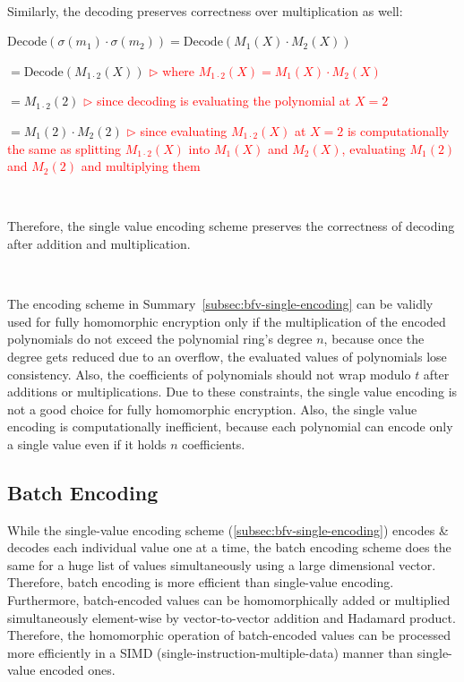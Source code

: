$ $

Similarly, the decoding preserves correctness over multiplication as well:

$\text{Decode}(\sigma(m_1) \cdot \sigma(m_2)) = \text{Decode}(M_1(X) \cdot M_2(X))$

$= \text{Decode}(M_{1\cdot2}(X))$ \textcolor{red}{$\rhd$ where $M_{1\cdot2}(X) = M_1(X) \cdot M_2(X)$}

$= M_{1\cdot2}(2)$ \textcolor{red}{$\rhd$ since decoding is evaluating the polynomial at $X = 2$}

$= M_{1}(2) \cdot M_{2}(2)$ \textcolor{red}{$\rhd$ since evaluating $M_{1\cdot2}(X)$ at $X=2$ is computationally the same as splitting $M_{1\cdot2}(X)$ into $M_{1}(X)$ and $M_{2}(X)$, evaluating $M_1(2)$ and $M_2(2)$ and multiplying them}




$ $

Therefore, the single value encoding scheme preserves the correctness of decoding after addition and multiplication. 

$ $

The encoding scheme in Summary~\ref*{subsec:bfv-single-encoding} can be validly used for fully homomorphic encryption only if the multiplication of the encoded polynomials do not exceed the polynomial ring's degree $n$, because once the degree gets reduced due to an overflow, the evaluated values of polynomials lose consistency. Also, the coefficients of polynomials should not wrap modulo $t$ after additions or multiplications. 
Due to these constraints, the single value encoding is not a good choice for fully homomorphic encryption. Also, the single value encoding is computationally inefficient, because each polynomial can encode only a single value even if it holds $n$ coefficients. 


\subsection{Batch Encoding}
\label{subsec:bfv-batch-encoding}

While the single-value encoding scheme (\autoref{subsec:bfv-single-encoding}) encodes \& decodes each individual value one at a time, the batch encoding scheme does the same for a huge list of values simultaneously using a large dimensional vector. Therefore, batch encoding is more efficient than single-value encoding. Furthermore, batch-encoded values can be homomorphically added or multiplied simultaneously element-wise by vector-to-vector addition and Hadamard product. Therefore, the homomorphic operation of batch-encoded values can be processed more efficiently in a SIMD (single-instruction-multiple-data) manner than single-value encoded ones. 

